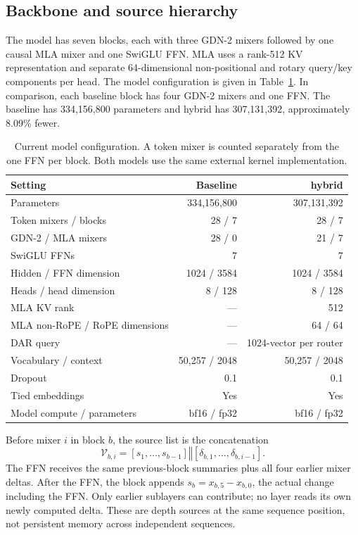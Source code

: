\documentclass[10pt,a4paper]{article}
\begin{document}
\subsection{Backbone and source hierarchy}
The model has seven blocks, each with three GDN-2 mixers followed by one causal MLA
mixer and one SwiGLU FFN. MLA uses a rank-512 KV representation and separate 64-dimensional
non-positional and rotary query/key components per head. The model configuration is
given in Table~\ref{tab:model}. In comparison, each baseline block has four GDN-2 mixers
and one FFN. The baseline has 334,156,800 parameters and hybrid has 307,131,392,
approximately 8.09\% fewer.

\begin{table}[htbp]\centering\small
\caption{Current model configuration. A token mixer is counted separately from the one FFN
per block. Both models use the same external kernel implementation.}\label{tab:model}
\begin{tabular}{lrr}\toprule Setting&Baseline&hybrid\\\midrule
Parameters&334,156,800&307,131,392\\
Token mixers / blocks&28 / 7&28 / 7\\
GDN-2 / MLA mixers&28 / 0&21 / 7\\
SwiGLU FFNs&7&7\\
Hidden / FFN dimension&1024 / 3584&1024 / 3584\\
Heads / head dimension&8 / 128&8 / 128\\
MLA KV rank&---&512\\
MLA non-RoPE / RoPE dimensions&---&64 / 64\\
DAR query&---&1024-vector per router\\
Vocabulary / context&50,257 / 2048&50,257 / 2048\\
Dropout&0.1&0.1\\
Tied embeddings&Yes&Yes\\
Model compute / parameters&bf16 / fp32&bf16 / fp32\\\bottomrule
\end{tabular}\end{table}

Before mixer $i$ in block $b$, the source list is the concatenation
\begin{equation}
 \mathcal V_{b,i}=[s_1,\ldots,s_{b-1}]\mathbin\Vert[\delta_{b,1},\ldots,\delta_{b,i-1}].
\end{equation}
The FFN receives the same previous-block summaries plus all four earlier mixer deltas.
After the FFN, the block appends $s_b=x_{b,5}-x_{b,0}$, the actual change including the FFN.
Only earlier sublayers can contribute; no layer reads its own newly computed delta.
These are depth sources at the same sequence position, not persistent memory across
independent sequences.
\end{document}
